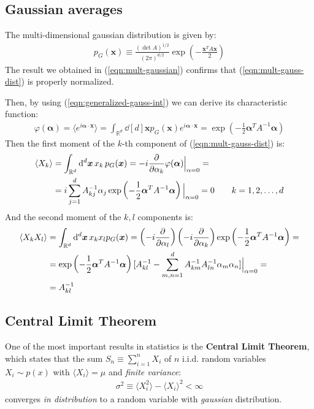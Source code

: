 \documentclass[../../main.tex]{subfiles}
\begin{document}
\subsection{Gaussian averages}
The multi-dimensional gaussian distribution is given by:
\begin{align} \label{eqn:mult-gauss-dist}
    p_G(\bm{x}) \equiv \frac{(\operatorname{det}A)^{1/2}}{(2 \pi)^{d/2}} \exp\left(-\frac{\bm{x}^T A \bm{x}}{2} \right)
\end{align}
The result we obtained in (\ref{eqn:mult-gaussian}) confirms that (\ref{eqn:mult-gauss-dist}) is properly normalized.

\medskip

Then, by using (\ref{eqn:generalized-gauss-int}) we can derive its characteristic function:
\begin{align*}
    \varphi(\bm{\alpha}) = \langle e^{i \bm{\alpha}\cdot \bm{x}} \rangle = \int_{\mathbb{R}^d} \dd[d]{\bm{x}} p_G(\bm{x}) e^{i \bm{\alpha} \cdot \bm{x}} = \exp\left(-\frac{1}{2} \bm{\alpha}^T A^{-1} \bm{\alpha} \right)
\end{align*}
Then the first moment of the $k$-th component of (\ref{eqn:mult-gauss-dist}) is:
\begin{align*} %
    \langle X_k \rangle &= \int_{\mathbb{R}^d} \dd[d]{\bm{x}} x_k \,p_G(\bm{x}) = -i \pdv{\alpha_k} \varphi(\bm{\alpha})\Big|_{\alpha = 0} =\\
    &= i \sum_{j=1}^d A_{kj}^{-1} \alpha_j \exp\left(-\frac{1}{2} \bm{\alpha}^T A^{-1} \bm{\alpha} \right) \Big|_{\alpha = 0} = 0 \qquad k=1,2,\dots,d
\end{align*}
And the second moment of the $k,l$ components is:
\begin{align*}
    \langle X_k X_l \rangle &= \int_{\mathbb{R}^d} \dd[d]{\bm{x}} x_k x_l p_G(\bm{x}) = \left(-i\pdv{\alpha_l}\right)\left(-i \pdv{\alpha_k}\right) \exp\left(-\frac{1}{2} \bm{\alpha}^T A^{-1} \bm{\alpha} \right)=\\
    &=\exp\left(-\frac{1}{2} \bm{\alpha}^T A^{-1} \bm{\alpha} \right) [A^{-1}_{kl} - \sum_{m,n=1}^d A^{-1}_{km} A^{-1}_{ln} \alpha_m \alpha_n] \Big|_{\alpha=0}=\\
    &= A^{-1}_{kl}
\end{align*}

\subsection{Central Limit Theorem}
One of the most important results in statistics is the \textbf{Central Limit Theorem}, which states that the sum $S_n \equiv \sum_{i=1}^n X_i$ of $n$ i.i.d. random variables $X_i \sim p(x)$ with $\langle X_i \rangle = \mu$ and \textit{finite variance}:
\begin{align*}
    \sigma^2 \equiv \langle X_i^2 \rangle - \langle X_i \rangle^2 < \infty
\end{align*} 
converges \textit{in distribution} to a random variable with \textit{gaussian} distribution.  
\end{document}
